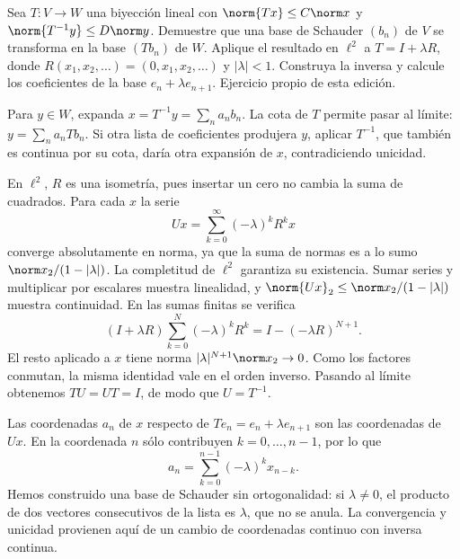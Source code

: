 \begin{ejercicio}\label{ej:ampl-schauder-4}
Sea $T:V\to W$ una biyección lineal con $\norm{Tx}\le C\norm x$ y $\norm{T^{-1}y}\le D\norm y$. Demuestre que una base de Schauder $(b_n)$ de $V$ se transforma en la base $(Tb_n)$ de $W$. Aplique el resultado en $\ell^2$ a $T=I+\lambda R$, donde $R(x_1,x_2,\ldots)=(0,x_1,x_2,\ldots)$ y $|\lambda|<1$. Construya la inversa y calcule los coeficientes de la base $e_n+\lambda e_{n+1}$. Ejercicio propio de esta edición.
\end{ejercicio}
\begin{solucion}
Para $y\in W$, expanda $x=T^{-1}y=\sum_na_nb_n$. La cota de $T$ permite pasar al límite: $y=\sum_na_nTb_n$. Si otra lista de coeficientes produjera $y$, aplicar $T^{-1}$, que también es continua por su cota, daría otra expansión de $x$, contradiciendo unicidad.

En $\ell^2$, $R$ es una isometría, pues insertar un cero no cambia la suma de cuadrados. Para cada $x$ la serie
\[
 Ux=\sum_{k=0}^{\infty}(-\lambda)^kR^kx
\]
converge absolutamente en norma, ya que la suma de normas es a lo sumo $\norm x_2/(1-|\lambda|)$. La completitud de $\ell^2$ garantiza su existencia. Sumar series y multiplicar por escalares muestra linealidad, y $\norm{Ux}_2\le\norm x_2/(1-|\lambda|)$ muestra continuidad. En las sumas finitas se verifica
\[
 (I+\lambda R)\sum_{k=0}^N(-\lambda)^kR^k
 =I-(-\lambda R)^{N+1}.
\]
El resto aplicado a $x$ tiene norma $|\lambda|^{N+1}\norm x_2\to0$. Como los factores conmutan, la misma identidad vale en el orden inverso. Pasando al límite obtenemos $TU=UT=I$, de modo que $U=T^{-1}$.

Las coordenadas $a_n$ de $x$ respecto de $Te_n=e_n+\lambda e_{n+1}$ son las coordenadas de $Ux$. En la coordenada $n$ sólo contribuyen $k=0,\ldots,n-1$, por lo que
\[
 a_n=\sum_{k=0}^{n-1}(-\lambda)^k x_{n-k}.
\]
Hemos construido una base de Schauder sin ortogonalidad: si $\lambda\ne0$, el producto de dos vectores consecutivos de la lista es $\lambda$, que no se anula. La convergencia y unicidad provienen aquí de un cambio de coordenadas continuo con inversa continua.
\end{solucion}

